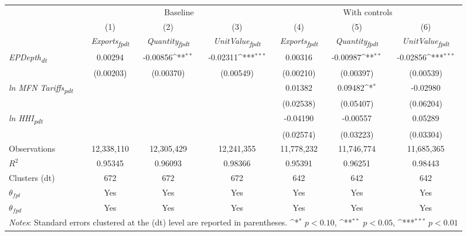 {
\def\sym#1{\ifmmode^{#1}\else\(^{#1}\)\fi}
\begin{tabular}{l*{6}{c}}
\toprule
&\multicolumn{3}{c}{Baseline}&\multicolumn{3}{c}{With controls}\\\cmidrule(lr){2-4}\cmidrule(lr){5-7}
&(1)&(2)&(3)&(4)&(5)&(6)\\
&\textit{Exports\textsubscript{fpdt}}&\textit{Quantity\textsubscript{fpdt}}&\textit{UnitValue\textsubscript{fpdt}}&\textit{Exports\textsubscript{fpdt}}&\textit{Quantity\textsubscript{fpdt}}&\textit{UnitValue\textsubscript{fpdt}}\\
\midrule
\textit{EPDepth\textsubscript{dt}} & 0.00294 & -0.00856\sym{**} & -0.02311\sym{***} & 0.00316 & -0.00987\sym{**} & -0.02856\sym{***}\\
 & (0.00203) & (0.00370) & (0.00549) & (0.00210) & (0.00397) & (0.00539)\\
\addlinespace
\textit{ln MFN Tariffs\textsubscript{pdt}} &  &  &  & 0.01382 & 0.09482\sym{*} & -0.02980\\
 &  &  &  & (0.02538) & (0.05407) & (0.06204)\\
\addlinespace
\textit{ln HHI\textsubscript{pdt}} &  &  &  & -0.04190 & -0.00557 & 0.05289\\
 &  &  &  & (0.02574) & (0.03223) & (0.03304)\\
\midrule
Observations & 12,338,110 & 12,305,429 & 12,241,355 & 11,778,232 & 11,746,774 & 11,685,365\\
$R^{2}$ & 0.95345 & 0.96093 & 0.98366 & 0.95391 & 0.96251 & 0.98443\\
Clusters (dt) & 672 & 672 & 672 & 642 & 642 & 642\\
$\theta_{fpt}$ & Yes & Yes & Yes & Yes & Yes & Yes\\
$\theta_{fpd}$ & Yes & Yes & Yes & Yes & Yes & Yes\\
\bottomrule
\multicolumn{7}{l}{\footnotesize \textit{Notes}: Standard errors clustered at the (dt) level are reported in parentheses. \sym{*} \(p<0.10\), \sym{**} \(p<0.05\), \sym{***} \(p<0.01\)}\\
\end{tabular}
}
